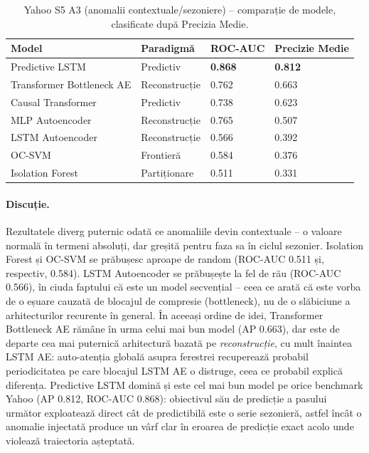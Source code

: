 \begin{table}[h]
\centering
\begin{tabular}{@{}llll@{}}
\toprule
Model & Paradigmă & ROC-AUC & Precizie Medie \\
\midrule
Predictive LSTM            & Predictiv     & \textbf{0.868} & \textbf{0.812} \\
Transformer Bottleneck AE  & Reconstrucție & 0.762          & 0.663 \\
Causal Transformer         & Predictiv     & 0.738          & 0.623 \\
MLP Autoencoder            & Reconstrucție & 0.765          & 0.507 \\
LSTM Autoencoder           & Reconstrucție & 0.566          & 0.392 \\
OC-SVM                     & Frontieră       & 0.584          & 0.376 \\
Isolation Forest           & Partiționare      & 0.511          & 0.331 \\
\bottomrule
\end{tabular}
\caption{Yahoo S5 A3 (anomalii contextuale/sezoniere) -- comparație de modele, clasificate după Precizia Medie.}
\label{tab:yahoo-a3}
\end{table}

\paragraph{Discuție.} Rezultatele diverg puternic odată ce anomaliile devin contextuale -- o valoare normală în termeni absoluți, dar greșită pentru faza sa în ciclul sezonier. 
Isolation Forest și OC-SVM se prăbușesc aproape de random (ROC-AUC 0.511 și, respectiv, 0.584).
LSTM Autoencoder se prăbușește la fel de rău (ROC-AUC 0.566), în ciuda faptului că este un model secvențial -- ceea ce arată că este vorba de o eșuare cauzată de blocajul de compresie (bottleneck), nu de o slăbiciune a arhitecturilor recurente în general.
În aceeași ordine de idei, Transformer Bottleneck AE rămâne în urma celui mai bun model (AP 0.663), dar este de departe cea mai puternică arhitectură bazată pe \emph{reconstrucție}, cu mult înaintea LSTM AE: auto-atenția globală asupra ferestrei recuperează probabil periodicitatea pe care blocajul LSTM AE o distruge, ceea ce probabil explică diferența.
Predictive LSTM domină și este cel mai bun model pe orice benchmark Yahoo (AP 0.812, ROC-AUC 0.868): obiectivul său de predicție a pasului următor exploatează direct cât de predictibilă este o serie sezonieră, astfel încât o anomalie injectată produce un vârf clar în eroarea de predicție exact acolo unde violează traiectoria așteptată.

